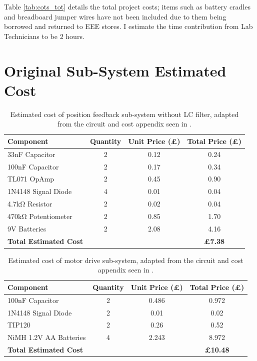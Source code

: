 \documentclass[11pt,a4paper, margin=20mm]{report}
\begin{document}
Table \ref{tab:cots_tot} details the total project costs; items such as battery cradles and breadboard jumper wires have not been included due to them being borrowed and returned to EEE stores. I estimate the time contribution from Lab Technicians to be 2 hours. 

\newpage
\section{Original Sub-System Estimated Cost}
\label{app:mouseecost_og}
\begin{table}[H]
    \centering
    \caption[Estimated Cost of Position Feedback Sub-System ]{Estimated cost of position feedback sub-system without LC filter, adapted from the circuit and cost appendix seen in \cite{Noah2023}.}
    \begin{tabular}{|l|c|c|c|}
    \hline
    \textbf{Component} & \textbf{Quantity} & \textbf{Unit Price (£)} & \textbf{Total Price (£)}\\ \hline
    33nF Capacitor & 2 & 0.12 & 0.24\\ \hline
    100nF Capacitor & 2 & 0.17 & 0.34\\ \hline
    TL071 OpAmp & 2 & 0.45 & 0.90\\ \hline
    1N4148 Signal Diode & 4 & 0.01 & 0.04\\ \hline
    4.7kΩ Resistor & 2 & 0.02 & 0.04\\ \hline
    470kΩ Potentiometer & 2 & 0.85 & 1.70\\ \hline
    9V Batteries & 2 & 2.08 & 4.16\\ \hline\hline
    \textbf{Total Estimated Cost} &&& \textbf{£7.38}\\ \hline
    \end{tabular}
\end{table}
\begin{table}[H]
    \centering
    \caption[Estimated Cost of Motor Drive Sub-System ]{Estimated cost of motor drive sub-system, adapted from the circuit and cost appendix seen in \cite{Noah2023}.}
    \begin{tabular}{|l|c|c|c|}
    \hline
    \textbf{Component} & \textbf{Quantity} & \textbf{Unit Price (£)} & \textbf{Total Price (£)}\\ \hline
    100nF Capacitor & 2 & 0.486 & 0.972\\ \hline
    1N4148 Signal Diode & 2 & 0.01 & 0.02\\ \hline
    TIP120 & 2 & 0.26 & 0.52\\ \hline
    NiMH 1.2V AA Batteries & 4 & 2.243 & 8.972\\ \hline\hline
    \textbf{Total Estimated Cost} &&& \textbf{£10.48}\\ \hline
    \end{tabular}
\end{table}
\end{document}
